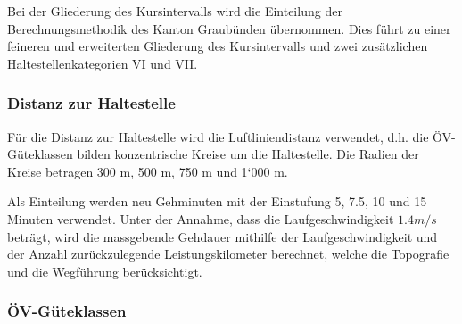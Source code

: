 Bei der Gliederung des Kursintervalls wird die Einteilung der Berechnungsmethodik des Kanton Graubünden übernommen.
Dies führt zu einer feineren und erweiterten Gliederung des Kursintervalls und zwei zusätzlichen Haltestellenkategorien VI und VII.

\subsubsection{Distanz zur Haltestelle}
\label{Zusammenhang zur Berechnungsmethodik ARE:Distanz zur Haltestelle}

\begin{itquote}
Für die Distanz zur Haltestelle wird die Luftliniendistanz verwendet, d.h. die ÖV-Güteklassen bilden konzentrische Kreise um die Haltestelle.
Die Radien der Kreise betragen 300 m, 500 m, 750 m und 1‘000 m.
\end{itquote}

Als Einteilung werden neu Gehminuten mit der Einstufung 5, 7.5, 10 und 15 Minuten verwendet.
Unter der Annahme, dass die Laufgeschwindigkeit $1.4 m/s$ beträgt, wird die massgebende Gehdauer mithilfe der Laufgeschwindigkeit und der Anzahl zurückzulegende \gls{Leistungskilometer} berechnet, welche die Topografie und die Wegführung berücksichtigt.

\subsubsection{ÖV-Güteklassen}
\label{Zusammenhang zur Berechnungsmethodik ARE:ÖV-Güteklassen}

